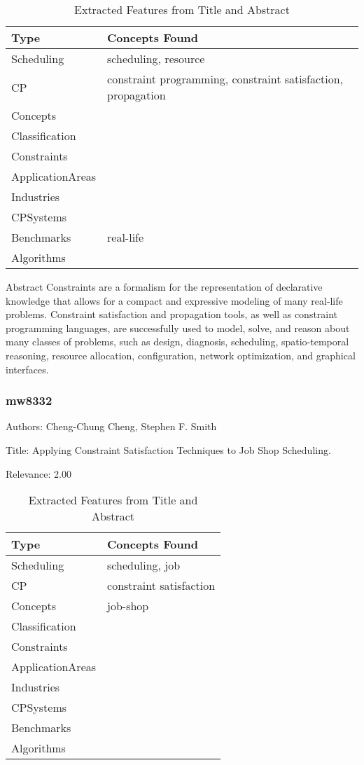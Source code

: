 {\scriptsize
\begin{longtable}{p{2cm}p{20cm}}
\caption{Extracted Features from Title and Abstract}\\ \toprule
Type & Concepts Found\\ \midrule
\endhead
\bottomrule
\endfoot
Scheduling & scheduling, resource\\ 
CP & constraint programming, constraint satisfaction, propagation\\ 
Concepts & \\ 
Classification & \\ 
Constraints & \\ 
ApplicationAreas & \\ 
Industries & \\ 
CPSystems & \\ 
Benchmarks & real-life\\ 
Algorithms & \\ 
\end{longtable}
}

 Abstract 
           Constraints are a formalism for the representation of declarative knowledge that allows for a compact and expressive modeling of many real‐life problems. Constraint satisfaction and propagation tools, as well as constraint programming languages, are successfully used to model, solve, and reason about many classes of problems, such as design, diagnosis, scheduling, spatio‐temporal reasoning, resource allocation, configuration, network optimization, and graphical interfaces. 

\subsubsection{mw8332}
\label{mw:mw8332}

Authors: Cheng-Chung Cheng, Stephen F. Smith

Title: Applying Constraint Satisfaction Techniques to Job Shop Scheduling.

Relevance:  2.00

{\scriptsize
\begin{longtable}{p{2cm}p{20cm}}
\caption{Extracted Features from Title and Abstract}\\ \toprule
Type & Concepts Found\\ \midrule
\endhead
\bottomrule
\endfoot
Scheduling & scheduling, job\\ 
CP & constraint satisfaction\\ 
Concepts & job-shop\\ 
Classification & \\ 
Constraints & \\ 
ApplicationAreas & \\ 
Industries & \\ 
CPSystems & \\ 
Benchmarks & \\ 
Algorithms & \\ 
\end{longtable}
}



